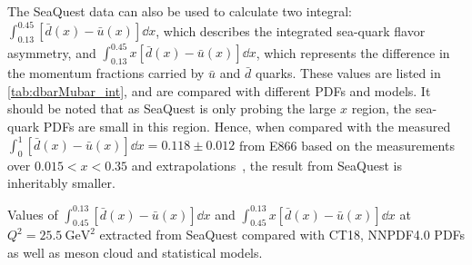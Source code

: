 \documentclass[../main.tex]{subfiles}
\begin{document}
The SeaQuest data can also be used to calculate two integral: $\int^{0.45}_{0.13} \left[\bar{d}\left(x\right) - \bar{u}\left(x\right) \right]\dd{x}$,
which describes the integrated sea-quark flavor asymmetry, and $\int^{0.45}_{0.13} x\left[\bar{d}\left(x\right) - \bar{u}\left(x\right) \right]\dd{x}$,
which represents the difference in the momentum fractions carried by $\bar{u}$ and $\bar{d}$ quarks.
These values are listed in \cref{tab:dbarMubar_int}, and are compared with different PDFs and models.
It should be noted that as SeaQuest is only probing the large $x$ region, the sea-quark PDFs are small in this region.
Hence, when compared with the measured $\int^{1}_{0} \left[\bar{d}\left(x\right) - \bar{u}\left(x\right) \right]\dd{x}=0.118\pm 0.012$
from E866 based on the measurements over $0.015<x<0.35$ and extrapolations~\cite{towell2001},
the result from SeaQuest is inheritably smaller.
\begin{table}[htpb!]
	\centering
	\caption{Values of $\int_{0.45}^{0.13} \left[\bar{d}\left(x\right) - \bar{u}\left(x\right)\right] \dd{x}$
		and $\int_{0.45}^{0.13} x\left[\bar{d}\left(x\right) - \bar{u}\left(x\right)\right] \dd{x}$ at $Q^2=\SI{25.5}{\GeV\squared}$ extracted from
		SeaQuest compared with CT18, NNPDF4.0 PDFs as well as meson cloud and statistical models.}
	\label{tab:dbarMubar_int}
	\renewcommand{\arraystretch}{1.5}
	\scalebox{0.93}{
		
	}
\end{table}

\begin{comment}
The impact of the SeaQuest measurement is further illustrated in \cref{fig:JAM_impact}.
The JAM analysis~\cite{cocuzza2021} found that the SeaQuest measurement greatly reduces the
uncertainties on the $\bar{d}/\bar{u}$ ratio, by up to $\approx 50\%$ at $x>0.3$.
The addition of the SeaQuest data also constrain the ratio to remain above unity up to values of $x\approx0.4$,
which is also in better agreement with prediction from various models, including meson-cloud and statistical model.
\begin{figure}[h!]
	\centering
	\texttt{[image: JAM\_impact]}
	\caption{impact on the $\bar{d}/\bar{u}$ ratio (top) and the asymmetry $x\left(\bar{d}-\bar{u}\right)$ (middle)
		of the SeaQuest measurement (red band) and STAR $W$ data \cite{adam2021} (blue band) relative to the baseline (green band)
		where the SeaQuest and STAR measurements are excluded in the JAM analysis~\cite{cocuzza2021}.
		The uncertainty on $\bar{d}/\bar{u}$ for these two scenarios normalized to that of the baseline
		are shown in the bottom panel. Taken from Ref.~\cite{cocuzza2021}.}
	\label{fig:JAM_impact}
\end{figure}
\end{comment}
\end{document}
